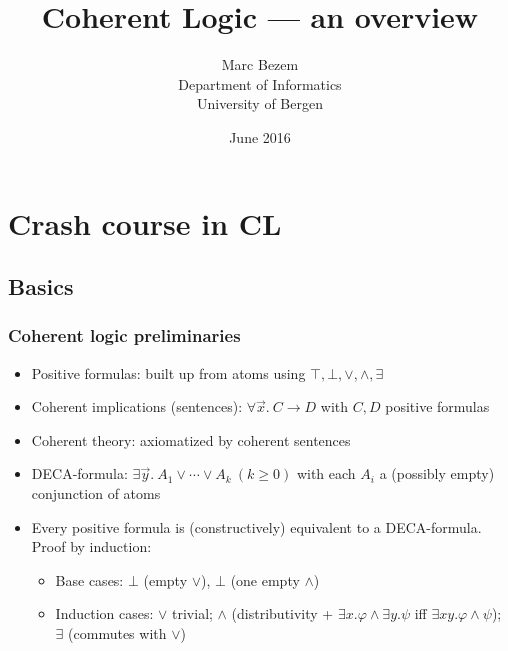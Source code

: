 \documentclass[handout,11pt]{beamer}
\title{Coherent Logic --- an overview}
\author{Marc Bezem\\
Department of Informatics\\
University of Bergen
}
\date{June 2016}
\begin{document}
\frame{\titlepage}

\section[Outline]{}
\frame{\tableofcontents}


\section{Crash course in CL}

\subsection{Basics}

\begin{frame}
\frametitle{Coherent logic preliminaries}
 \begin{itemize}[<+->]   %
    \item Positive formulas: built up from atoms using 
    $\top,\bot,\lor,\land,\exists$
    \item Coherent implications (sentences): $\forall\vec{x}.~C \to D$ 
    with $C,D$ positive formulas
    \item Coherent theory: axiomatized by coherent sentences
    \item DECA-formula: 
    $\exists \vec{y}.~A_1 \lor \cdots \lor A_k~(k\geq 0)$
    with each $A_i$ a (possibly empty) conjunction of atoms
    \item Every positive formula is (constructively) equivalent to
    a DECA-formula. Proof by induction:
    \begin{itemize}[<+->]   %
    \item Base cases: $\bot$ (empty $\lor$), $\bot$ (one empty $\land$)
    \item Induction cases: $\lor$ trivial; 
    $\land$ (distributivity + $\exists x. \varphi \land \exists y.\psi$ iff 
                              $\exists xy. \varphi\land\psi$);
    $\exists$ (commutes with $\vee$)    
    \end{itemize}
 \end{itemize}
\end{frame}
\end{document}
